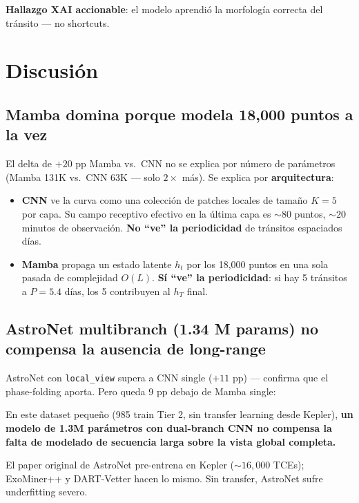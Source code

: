 \documentclass[11pt, a4paper]{article}
\begin{document}
\textbf{Hallazgo XAI accionable}: el modelo aprendió la morfología correcta del tránsito --- no shortcuts.

\section{Discusión}

\subsection{Mamba domina porque modela 18,000 puntos a la vez}

El delta de $+20$ pp Mamba vs.\ CNN no se explica por número de parámetros (Mamba 131K vs.\ CNN 63K --- solo $2\times$ más). Se explica por \textbf{arquitectura}:

\begin{itemize}[leftmargin=*, topsep=0pt]
    \item \textbf{CNN} ve la curva como una colección de patches locales de tamaño $K=5$ por capa. Su campo receptivo efectivo en la última capa es $\sim 80$ puntos, $\sim 20$ minutos de observación. \textbf{No ``ve'' la periodicidad} de tránsitos espaciados días.
    \item \textbf{Mamba} propaga un estado latente $h_t$ por los 18,000 puntos en una sola pasada de complejidad $O(L)$. \textbf{Sí ``ve'' la periodicidad}: si hay 5 tránsitos a $P=5.4$ días, los 5 contribuyen al $h_T$ final.
\end{itemize}

\subsection{AstroNet multibranch (1.34 M params) no compensa la ausencia de long-range}

AstroNet con \texttt{local\_view} supera a CNN single ($+11$ pp) --- confirma que el phase-folding aporta. Pero queda 9 pp debajo de Mamba single:

\begin{keybox}
En este dataset pequeño (985 train Tier 2, sin transfer learning desde Kepler), \textbf{un modelo de 1.3M parámetros con dual-branch CNN no compensa la falta de modelado de secuencia larga sobre la vista global completa.}
\end{keybox}

El paper original de AstroNet pre-entrena en Kepler ($\sim 16{,}000$ TCEs); ExoMiner++ y DART-Vetter hacen lo mismo. Sin transfer, AstroNet sufre underfitting severo.
\end{document}
